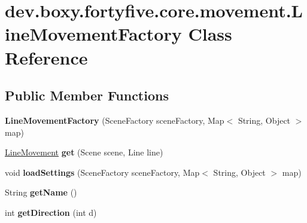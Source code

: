 \hypertarget{classdev_1_1boxy_1_1fortyfive_1_1core_1_1movement_1_1_line_movement_factory}{
\section{dev.boxy.fortyfive.core.movement.LineMovementFactory Class Reference}
\label{d4/d4d/classdev_1_1boxy_1_1fortyfive_1_1core_1_1movement_1_1_line_movement_factory}
}
\subsection*{Public Member Functions}
\begin{DoxyCompactItemize}
\item 
\hypertarget{classdev_1_1boxy_1_1fortyfive_1_1core_1_1movement_1_1_line_movement_factory_a9becc9a221fa0d973a34270bec8d6f0c}{
{\bfseries LineMovementFactory} (SceneFactory sceneFactory, Map$<$ String, Object $>$ map)}
\label{d4/d4d/classdev_1_1boxy_1_1fortyfive_1_1core_1_1movement_1_1_line_movement_factory_a9becc9a221fa0d973a34270bec8d6f0c}

\item 
\hypertarget{classdev_1_1boxy_1_1fortyfive_1_1core_1_1movement_1_1_line_movement_factory_ae8ec9beb5bac8692522cd31f01a3844f}{
\hyperlink{classdev_1_1boxy_1_1fortyfive_1_1core_1_1movement_1_1_line_movement}{LineMovement} {\bfseries get} (Scene scene, Line line)}
\label{d4/d4d/classdev_1_1boxy_1_1fortyfive_1_1core_1_1movement_1_1_line_movement_factory_ae8ec9beb5bac8692522cd31f01a3844f}

\item 
\hypertarget{classdev_1_1boxy_1_1fortyfive_1_1core_1_1movement_1_1_line_movement_factory_a7794e75a68265e4104094e32e026c267}{
void {\bfseries loadSettings} (SceneFactory sceneFactory, Map$<$ String, Object $>$ map)}
\label{d4/d4d/classdev_1_1boxy_1_1fortyfive_1_1core_1_1movement_1_1_line_movement_factory_a7794e75a68265e4104094e32e026c267}

\item 
\hypertarget{classdev_1_1boxy_1_1fortyfive_1_1core_1_1movement_1_1_line_movement_factory_a3582d1beb3d1db11ba6982b117254d1c}{
String {\bfseries getName} ()}
\label{d4/d4d/classdev_1_1boxy_1_1fortyfive_1_1core_1_1movement_1_1_line_movement_factory_a3582d1beb3d1db11ba6982b117254d1c}

\item 
\hypertarget{classdev_1_1boxy_1_1fortyfive_1_1core_1_1movement_1_1_line_movement_factory_a37ed7076f85ec33aa4817bf313ba73d9}{
int {\bfseries getDirection} (int d)}
\label{d4/d4d/classdev_1_1boxy_1_1fortyfive_1_1core_1_1movement_1_1_line_movement_factory_a37ed7076f85ec33aa4817bf313ba73d9}

\end{DoxyCompactItemize}
